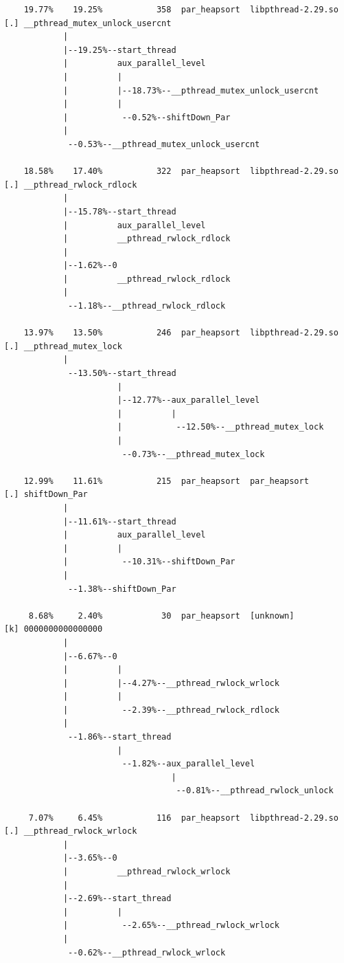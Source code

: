 \documentclass{article}
\begin{document}
\begin{verbatim}
    19.77%    19.25%           358  par_heapsort  libpthread-2.29.so  [.] __pthread_mutex_unlock_usercnt
            |
            |--19.25%--start_thread
            |          aux_parallel_level
            |          |
            |          |--18.73%--__pthread_mutex_unlock_usercnt
            |          |
            |           --0.52%--shiftDown_Par
            |
             --0.53%--__pthread_mutex_unlock_usercnt

    18.58%    17.40%           322  par_heapsort  libpthread-2.29.so  [.] __pthread_rwlock_rdlock
            |
            |--15.78%--start_thread
            |          aux_parallel_level
            |          __pthread_rwlock_rdlock
            |
            |--1.62%--0
            |          __pthread_rwlock_rdlock
            |
             --1.18%--__pthread_rwlock_rdlock

    13.97%    13.50%           246  par_heapsort  libpthread-2.29.so  [.] __pthread_mutex_lock
            |
             --13.50%--start_thread
                       |
                       |--12.77%--aux_parallel_level
                       |          |
                       |           --12.50%--__pthread_mutex_lock
                       |
                        --0.73%--__pthread_mutex_lock

    12.99%    11.61%           215  par_heapsort  par_heapsort        [.] shiftDown_Par
            |
            |--11.61%--start_thread
            |          aux_parallel_level
            |          |
            |           --10.31%--shiftDown_Par
            |
             --1.38%--shiftDown_Par

     8.68%     2.40%            30  par_heapsort  [unknown]           [k] 0000000000000000
            |
            |--6.67%--0
            |          |
            |          |--4.27%--__pthread_rwlock_wrlock
            |          |
            |           --2.39%--__pthread_rwlock_rdlock
            |
             --1.86%--start_thread
                       |
                        --1.82%--aux_parallel_level
                                  |
                                   --0.81%--__pthread_rwlock_unlock

     7.07%     6.45%           116  par_heapsort  libpthread-2.29.so  [.] __pthread_rwlock_wrlock
            |
            |--3.65%--0
            |          __pthread_rwlock_wrlock
            |
            |--2.69%--start_thread
            |          |
            |           --2.65%--__pthread_rwlock_wrlock
            |
             --0.62%--__pthread_rwlock_wrlock


\end{verbatim}
\end{document}

